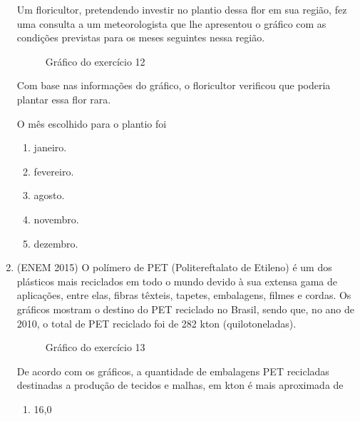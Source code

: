 \begin{enumerate}
\begin{itemize}
\end{itemize}

Um floricultor, pretendendo investir no plantio dessa flor em sua região, fez uma consulta a um meteorologista que lhe apresentou o gráfico com as condições previstas para os   meses seguintes nessa região.

\begin{figure}[H]
\centering
\capstart

\noindent{}
\caption{Gráfico do exercício 12}\label{\detokenize{PE103-E:id5}}\label{\detokenize{PE103-E:id22}}\end{figure}

Com base nas informações do gráfico, o floricultor verificou que poderia plantar essa flor rara.

O mês escolhido para o plantio foi
\begin{enumerate}
\item {} 
janeiro.

\item {} 
fevereiro.

\item {} 
agosto.

\item {} 
novembro.

\item {} 
dezembro.

\end{enumerate}

\item (ENEM 2015)  O polímero de PET (Politereftalato de Etileno) é um dos plásticos mais reciclados em todo o mundo devido à sua extensa gama de aplicações, entre elas, fibras têxteis, tapetes, embalagens, filmes e cordas. Os gráficos mostram o destino do PET reciclado no Brasil, sendo que, no ano de 2010, o total de PET reciclado foi de 282 kton (quilotoneladas).

\begin{figure}[H]
\centering
\capstart

\noindent{}
\caption{Gráfico do exercício 13}\label{\detokenize{PE103-E:id6}}\label{\detokenize{PE103-E:id23}}\end{figure}

De acordo com os gráficos, a quantidade de embalagens PET recicladas destinadas a produção de tecidos e malhas, em kton é mais aproximada de
\begin{enumerate}
\item {} 
16,0


\end{enumerate}
\end{enumerate}
